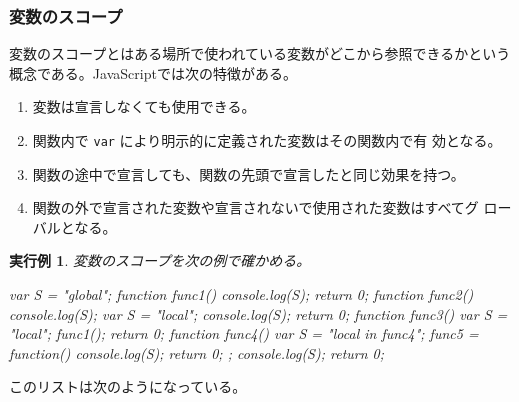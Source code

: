\documentclass[a4j]{jarticle}
\newtheorem{Exec}{実行例}[section]
\begin{document}
\subsubsection{変数のスコープ}
変数のスコープとはある場所で使われている変数がどこから参照できるかという
概念である。JavaScriptでは次の特徴がある。
\begin{enumerate}
 \item 変数は宣言しなくても使用できる。\label{3-4NoDeclare}
 \item 関数内で \verb+var+ により明示的に定義された変数はその関数内で有
       効となる。\label{3-4DeclareInFunc}
 \item 関数の途中で宣言しても、関数の先頭で宣言したと同じ効果を持つ。
       \label{3-4DeclareInFunc2}
 \item 関数の外で宣言された変数や宣言されないで使用された変数はすべてグ
       ローバルとなる。\label{3-4Declare2}
\end{enumerate}
\begin{Exec}\label{ExecScope}
変数のスコープを次の例で確かめる。
\begin{listing}{1}
var S = "global";
function func1(){
  console.log(S);
  return 0;
}
function func2(){
  console.log(S);
  var S = "local";
  console.log(S);
  return 0;
}
function func3(){
  var S = "local";
  func1();
  return 0;
}
function func4(){
  var S = "local in func4";
  func5 = function() {
    console.log(S);
    return 0;
  };
  console.log(S);
  return 0;
}
\end{listing}
\end{Exec}
このリストは次のようになっている。
\end{document}
